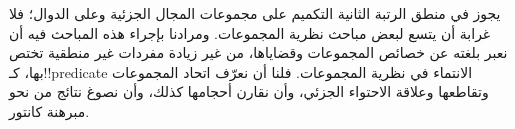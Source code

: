 \documentclass[../../../include/open-logic-section]{subfiles}
\begin{document}


يجوز في منطق الرتبة الثانية التكميم على مجموعات المجال الجزئية
وعلى الدوال؛ فلا غرابة أن يتسع لبعض مباحث نظرية المجموعات.
ومرادنا بإجراء هذه المباحث فيه أن نعبر بلغته عن خصائص المجموعات
وقضاياها، من غير زيادة مفردات غير منطقية تختص بها، كـ!!{predicate}
الانتماء في نظرية المجموعات. فلنا أن نعرّف اتحاد المجموعات
وتقاطعها وعلاقة الاحتواء الجزئي، وأن نقارن أحجامها كذلك،
وأن نصوغ نتائج من نحو مبرهنة كانتور.
\end{document}
